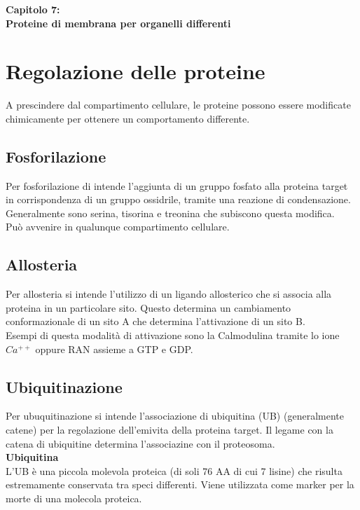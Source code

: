 \Large\textbf{Capitolo 7: \\Proteine di membrana per organelli differenti}\\

\small

\section{Regolazione delle proteine}
    A prescindere dal compartimento cellulare, le proteine possono essere modificate chimicamente per ottenere un comportamento differente. 
    \subsection{Fosforilazione}
        Per fosforilazione di intende l'aggiunta di un gruppo fosfato alla proteina target in corrispondenza di un gruppo ossidrile, tramite una reazione di condensazione. Generalmente sono serina, tisorina e treonina che subiscono questa modifica. \\
        Può avvenire in qualunque compartimento cellulare.
        
    \subsection{Allosteria}
        Per allosteria si intende l'utilizzo di un ligando allosterico che si associa alla proteina in un particolare sito. Questo determina un cambiamento conformazionale di un sito A che determina l'attivazione di un sito B.\\
        Esempi di questa modalità di attivazione sono la Calmodulina tramite lo ione $Ca^{++}$ oppure RAN assieme a GTP e GDP.
        
    \subsection{Ubiquitinazione}
        Per ubuquitinazione si intende l'associazione di ubiquitina (UB) (generalmente catene) per la regolazione dell'emivita della proteina target. Il legame con la catena di ubiquitine determina l'associazine con il proteosoma. \\
        
        \textbf{Ubiquitina}\\
            L'UB è una piccola molevola proteica (di soli 76 AA di cui 7 lisine) che risulta estremamente conservata tra speci differenti. Viene utilizzata come marker per la morte di una molecola proteica.\\
            

